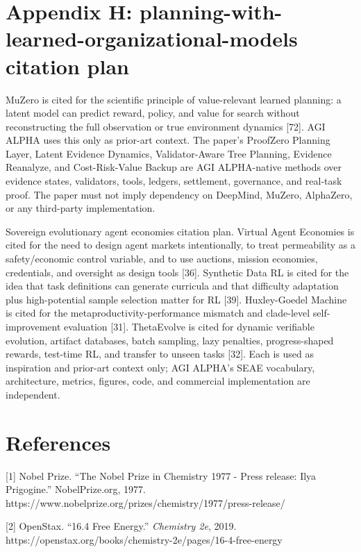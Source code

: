 \documentclass[11pt]{article}
\begin{document}
\section{Appendix H: planning-with-learned-organizational-models citation plan}\label{appendix-h-planning-with-learned-organizational-models-citation-plan}

MuZero is cited for the scientific principle of value-relevant learned planning: a latent model can predict reward, policy, and value for search without reconstructing the full observation or true environment dynamics {[}72{]}. AGI ALPHA uses this only as prior-art context. The paper's ProofZero Planning Layer, Latent Evidence Dynamics, Validator-Aware Tree Planning, Evidence Reanalyze, and Cost-Risk-Value Backup are AGI ALPHA-native methods over evidence states, validators, tools, ledgers, settlement, governance, and real-task proof. The paper must not imply dependency on DeepMind, MuZero, AlphaZero, or any third-party implementation.

Sovereign evolutionary agent economies citation plan. Virtual Agent Economies is cited for the need to design agent markets intentionally, to treat permeability as a safety/economic control variable, and to use auctions, mission economies, credentials, and oversight as design tools {[}36{]}. Synthetic Data RL is cited for the idea that task definitions can generate curricula and that difficulty adaptation plus high-potential sample selection matter for RL {[}39{]}. Huxley-Goedel Machine is cited for the metaproductivity-performance mismatch and clade-level self-improvement evaluation {[}31{]}. ThetaEvolve is cited for dynamic verifiable evolution, artifact databases, batch sampling, lazy penalties, progress-shaped rewards, test-time RL, and transfer to unseen tasks {[}32{]}. Each is used as inspiration and prior-art context only; AGI ALPHA's SEAE vocabulary, architecture, metrics, figures, code, and commercial implementation are independent.

\section{References}\label{references}

{[}1{]} Nobel Prize. ``The Nobel Prize in Chemistry 1977 - Press release: Ilya Prigogine.'' NobelPrize.org, 1977. https://www.nobelprize.org/prizes/chemistry/1977/press-release/

{[}2{]} OpenStax. ``16.4 Free Energy.'' \emph{Chemistry 2e}, 2019. https://openstax.org/books/chemistry-2e/pages/16-4-free-energy
\end{document}
